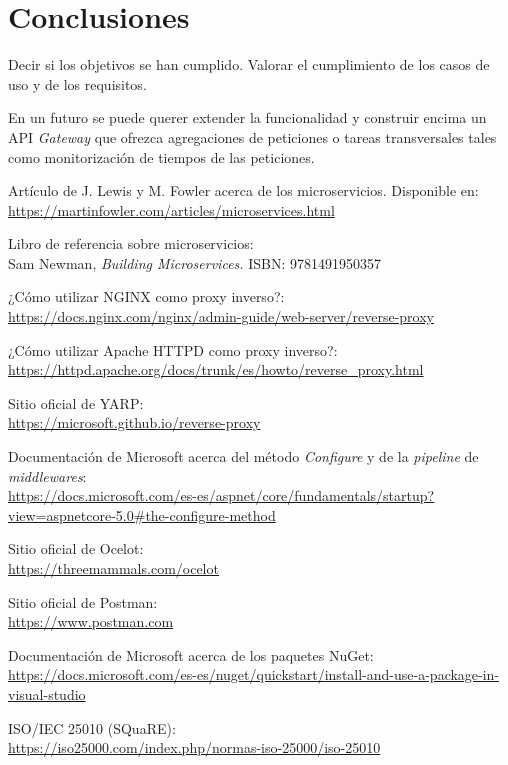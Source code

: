 \documentclass[11pt,spanish,listoffigures]{tfgetsinf}
\begin{document}
\chapter{Conclusiones}

Decir si los objetivos se han cumplido. Valorar el cumplimiento de los casos de uso y de los requisitos.

En un futuro se puede querer extender la funcionalidad y construir encima un API \emph{Gateway} que ofrezca agregaciones de peticiones o tareas transversales tales como monitorización de tiempos de las peticiones.


\begin{thebibliography}{10}

Artículo de J. Lewis y M. Fowler acerca de los microservicios.
\newblock Disponible en:\\
\url{https://martinfowler.com/articles/microservices.html}

Libro de referencia sobre microservicios:\\
\newblock Sam Newman,
\newblock \emph{Building Microservices.}
\newblock ISBN: 9781491950357

¿Cómo utilizar NGINX como proxy inverso?:\\
\url{https://docs.nginx.com/nginx/admin-guide/web-server/reverse-proxy}

¿Cómo utilizar Apache HTTPD como proxy inverso?:\\
\url{https://httpd.apache.org/docs/trunk/es/howto/reverse_proxy.html}

Sitio oficial de YARP:\\
\url{https://microsoft.github.io/reverse-proxy}

Documentación de Microsoft acerca del método \emph{Configure} y de la \emph{pipeline} de \emph{middlewares}:\\
\url{https://docs.microsoft.com/es-es/aspnet/core/fundamentals/startup?view=aspnetcore-5.0#the-configure-method}

Sitio oficial de Ocelot:\\
\url{https://threemammals.com/ocelot}

Sitio oficial de Postman:\\
\url{https://www.postman.com}

Documentación de Microsoft acerca de los paquetes NuGet:\\
\url{https://docs.microsoft.com/es-es/nuget/quickstart/install-and-use-a-package-in-visual-studio}

ISO/IEC 25010 (SQuaRE):\\
\url{https://iso25000.com/index.php/normas-iso-25000/iso-25010}

\end{thebibliography}
\end{document}
